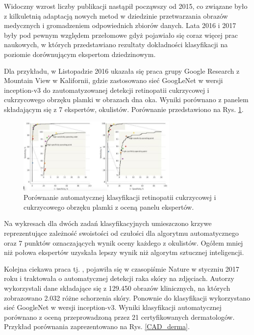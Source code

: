  Widoczny wzrost liczby publikacji nastąpił począwszy od 2015, co związane było z kilkuletnią adaptacją nowych metod w dziedzinie przetwarzania obrazów medycznych i gromadzeniem odpowiednich zbiorów danych. Lata 2016 i 2017 były pod pewnym względem przełomowe gdyż pojawiało się coraz więcej prac naukowych, w których przedstawiano rezultaty dokładności klasyfikacji na poziomie dorównującym ekspertom dziedzinowym.
 
 Dla przykładu, w Listopadzie 2016 ukazała się praca \cite{Gulshan2016} grupy Google Research z Mountain View w Kalifornii, gdzie zastosowano sieć GoogLeNet w wersji inception-v3 do zautomatyzowanej detekcji retinopatii cukrzycowej i cukrzycowego obrzęku plamki w obrazach dna oka. Wyniki porównano z panelem składającym się z 7 ekspertów, okulistów. Porównanie przedstawiono na Rys. \ref{CAD_opto}.
 \begin{figure}[h!]
 	\centering
 	\includegraphics[width=0.7\textwidth]{figures/CAD-okulisci.jpg}
 	\caption{Porównanie automatycznej klasyfikacji retinopatii cukrzycowej i cukrzycowego obrzęku plamki z oceną panelu ekspertów.}
 	\label{CAD_opto}
 \end{figure}
 
 Na wykresach dla dwóch zadań klasyfikacyjnych umieszczono krzywe reprezentujące zależność swoistości od czułości dla algorytmu automatycznego oraz 7 punktów oznaczających wynik oceny każdego z okulistów. Ogółem mniej niż połowa ekspertów uzyskała lepszy wynik niż algorytm sztucznej inteligencji.
 
 Kolejna ciekawa praca tj. \cite{Esteva2017}, pojawiła się w czasopiśmie Nature w styczniu 2017 roku i traktowała o automatycznej detekcji raka skóry na zdjęciach. Autorzy wykorzystali dane składające się z 129.450 obrazów klinicznych, na których zobrazowano 2.032 różne schorzenia skóry. Ponownie do klasyfikacji wykorzystano sieć GoogleNet w wersji inception-v3. Wyniki klasyfikacji automatycznej porównano z oceną przeprowadzoną przez 21 certyfikowanych dermatologów. Przykład porównania zaprezentowano na Rys. \ref{CAD_derma}. 
 
